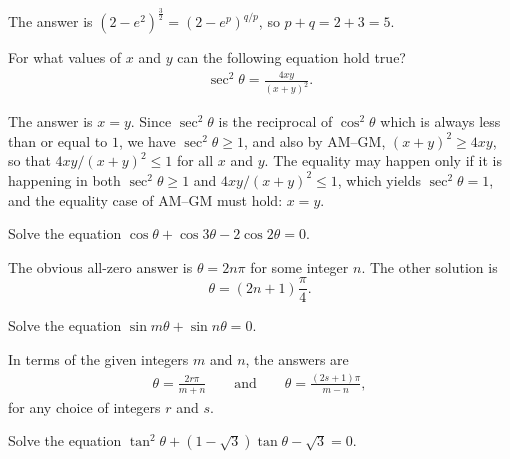 \begin{solution}
    The answer is $\displaystyle \left(2-e^2\right)^{\frac{3}{2}} = (2-e^p)^{q/p}$, so $p+q=2+3=5$.
\end{solution}


\begin{question}
For what values of $x$ and $y$ can the following equation hold true?
    \begin{align*}
       \sec^2 \theta = \frac{4xy}{(x+y)^2}.
    \end{align*}
\end{question}

\begin{solution}
    The answer is $x=y$. Since $\sec^2 \theta$ is the reciprocal of $\cos^2 \theta$ which is always less than or equal to $1$, we have $\sec^2\theta \geq 1$, and also by AM--GM, $(x+y)^2 \geq 4xy$, so that $4xy/(x+y)^2 \leq 1$ for all $x$ and $y$. The equality may happen only if it is happening in both  $\sec^2\theta \geq 1$ and $4xy/(x+y)^2 \leq 1$, which yields $\sec^2\theta=1$, and the equality case of AM--GM must hold: $x=y$.
\end{solution}



\begin{question}
Solve the equation $\cos \theta + \cos 3\theta - 2 \cos 2\theta = 0$.
\end{question}

\begin{solution}
    The obvious all-zero answer is $\theta=2n\pi$ for some integer $n$. The other solution is $$\theta = (2n+1)\frac{\pi}{4}.$$
\end{solution}



\begin{question}
Solve the equation $\sin m\theta + \sin n\theta = 0$.
\end{question}

\begin{solution}
In terms of the given integers $m$ and $n$, the answers are 
\begin{align*}
    \theta = \frac{2r\pi}{m+n} \qquad \text{and} \qquad  \theta = \frac{(2s+1)\pi}{m-n},
\end{align*}
for any choice of integers $r$ and $s$.
\end{solution}





\begin{question}
Solve the equation $\tan^2 \theta + (1-\sqrt 3)\tan \theta - \sqrt 3= 0$.
\end{question}


